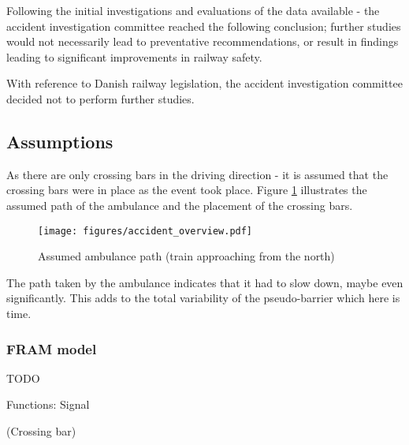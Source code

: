 Following the initial investigations and evaluations of the data available - the accident investigation committee reached the following conclusion; further studies would not necessarily lead to preventative recommendations, or result in findings leading to significant improvements in railway safety.

With reference to Danish railway legislation, the accident investigation committee decided not to perform further studies. 

\subsection{Assumptions}
As there are only crossing bars in the driving direction - it is assumed that the crossing bars were in place as the event took place. Figure \ref{fig:ambulance_path} illustrates the assumed path of the ambulance and the placement of the crossing bars.
\begin{figure}
 \centering
   \texttt{[image: figures/accident\_overview.pdf]}
 \caption{Assumed ambulance path (train approaching from the north)}
 \label{fig:ambulance_path}
\end{figure}
The path taken by the ambulance indicates that it had to slow down, maybe even significantly. This adds to the total variability of the pseudo-barrier which here is time.

\subsubsection{FRAM model}
TODO




% 

Functions: 
Signal

(Crossing bar)



